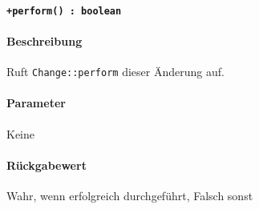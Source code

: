 \paragraph{\texttt{+perform() : boolean}}%
\paragraph*{Beschreibung}
Ruft \verb#Change::perform# dieser Änderung auf.
\paragraph*{Parameter}
Keine
\paragraph*{Rückgabewert}
Wahr, wenn erfolgreich durchgeführt, Falsch sonst